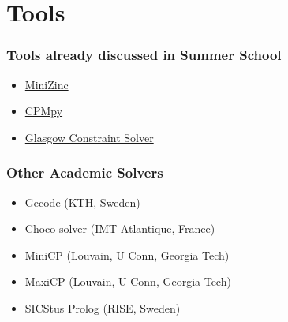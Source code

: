 \section{Tools}

\begin{frame}
\frametitle{Tools already discussed in Summer School}
\begin{itemize}
\item \href{https://minizinc.org}{MiniZinc}
\item \href{https://cpmpy.readthedocs.io}{CPMpy}
\item \href{https://github.com/ciaranm/glasgow-constraint-solver}{Glasgow Constraint Solver}
\end{itemize}
\end{frame}

\begin{frame}
\frametitle{Other Academic Solvers}
\begin{itemize}
\item Gecode (KTH, Sweden)
\item Choco-solver (IMT Atlantique, France)
\item MiniCP (Louvain, U Conn, Georgia Tech)
\item MaxiCP (Louvain, U Conn, Georgia Tech)
\item SICStus Prolog (RISE, Sweden) 
\end{itemize}
\end{frame}

